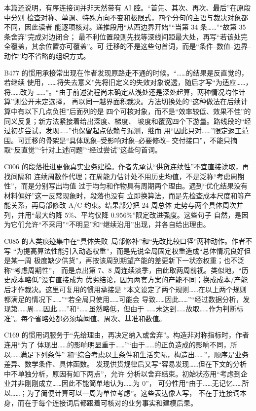 本篇还说明，有序连接词并非天然带有 AI 腔。“首先、其次、再次、最后”在原段中分别
检查对称、单调、特殊方向不变和极限式，四个分句的主语与裁决对象都不同，因此读者
能逐项核对。递推段用“从西边界开始”“当第 34 条……”“故第 35 条舍弃”完成对边闭合；
最不利位置段则先找等深线间距最大处，再写“若该处完全覆盖，其余位置亦可覆盖”。可
迁移的不是这些句首词，而是“条件--数值--边界--动作”均不省略的组织方式。

B477 的惯用承接常出现在作者发现原路走不通的时候。“……的结果是反直觉的，若继续
使用，……将失去意义”先将旧定义的失效对象说透，随后才写“为适应……，将……改为
……”。“由于前述流程尚未确定从浅处还是深处起算，两种情况均作计算”则公开未定选择，
再以同一越界面积裁决。方法切换处的“这种做法在后续计算中有以下几点负担”后面列的是
四个可核对象，而不是“效率较低、效果不佳”的同义反复；新方法紧接着给出深度、梯度、
坡度和覆宽四个下游量。路线段的“经过初步尝试，发现……”也保留起点依赖与漏测，继而
用“因此只对……”限定返工范围。可迁移的骨架是“具体现象--受影响对象--必要修改--
交付接口”，不能只摘取“反直觉”“针对上述问题”“经过尝试”这些句首词。

C006 的段落推进更像真实业务建模。作者先承认“供货连续性”不宜直接读取，再找间隔和
连续周数作代理；在周能力估计处不用历史均值，不是泛称“考虑周期性”，而是分别写出均值
过于均匀和作物具有周期两个理由。遇到“优化结果没有材料偏好”这一反常现象时，段落也没有
立即换算法，而是先检查成本尺度和等产能关系，再局部修改 A/C 约束。结果部分把 24 周总体
走势与两个具体周次并列，并用“最大约降 $5\%$、平均仅降 $0.956\%$”限定改进强度。这些句子
自然，是因为它们允许“不采用”“不明显”和“继续沿用”出现，并各自给出理由。

C085 的人类痕迹集中在“具体失败--局部修补”和“先改比较口径”两种动作。作者不写
“为提高算法性能引入动态权重”，而是先说全局固定权重造成“总体情况良好但是某一周
极度缺少供货”，再按该周到期望产能的差更新下一状态权重；也不泛称“考虑周期性”，
而是点出第 7、8 周连续淡季，由此取两周前视。类似地，“历史成本略低”没有直接成为
优劣结论，因为两套方案的产能不同；换成成本/产能后才作裁决。这里可复用的惯用承接是
“本文设定了两个规则……在以上两个规则都满足的情况下……”“若全局只使用……可能会
导致……因此……”“经过数据分析，发现第……周……因此……”和“……虽然略低，但由于
……未达到……故取……作为判断标准”。每个省略处都必须填阈值、周次、基准和数值。

C169 的惯用词服务于“先给理由，再决定纳入或舍弃”。构造非对称指标时，作者连用“为了
体现出……的影响明显重于……”“由于……的正负造成的影响不同，所以……满足下列条件”
和“综合考虑以上条件和生活实际，构造出……”，顺序是业务差异、数学条件、具体函数。
发现供货规律后又写“容易发现……但在下文的分析中不单独分析，原因有如下两点”，允许
分析以舍弃结束。初始状态用“考虑到企业并非刚刚成立……因此不能简单地认为……为 0”，
可分性用“由于……无记忆……所以……；为了简便计算可以一周为单位考虑”。这些表达像人写，
不在于连接词本身，而在于每个连接词后都跟着可核对的业务事实和建模后果。

